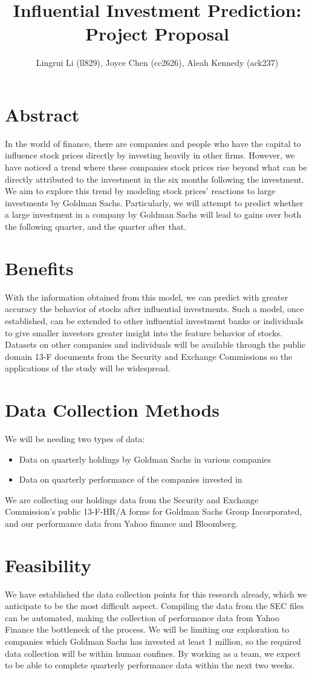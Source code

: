 \documentclass{article}
\title{Influential Investment Prediction: Project Proposal}
\author{Lingrui Li (ll829), Joyce Chen (cc2626), Aleah Kennedy (ack237)}
\begin{document}
\maketitle
\section*{Abstract}
In the world of finance, there are companies and people who have the capital to influence stock prices directly by investing heavily in other firms. However, we have noticed a trend where these companies stock prices rise beyond what can be directly attributed to the investment in the six months following the investment. We aim to explore this trend by modeling stock prices' reactions to large investments by Goldman Sachs. Particularly, we will attempt to predict whether a large investment in a company by Goldman Sachs will lead to gains over both the following quarter, and the quarter after that.

\section*{Benefits}
With the information obtained from this model, we can predict with greater accuracy the behavior of stocks after influential investments. Such a model, once established, can be extended to other influential investment banks or individuals to give smaller investors greater insight into the feature behavior of stocks. Datasets on other companies and individuals will be available through the public domain 13-F documents from the Security and Exchange Commissions so the applications of the study will be widespread.

\section*{Data Collection Methods} 
We will be needing two types of data: 
\begin{itemize}
\item Data on quarterly holdings by Goldman Sachs in various companies
\item Data on quarterly performance of the companies invested in
\end{itemize}

We are collecting our holdings data from the Security and Exchange Commission's public 13-F-HR/A forms for Goldman Sachs Group Incorporated, and our performance data from Yahoo finance and Bloomberg. 
\section*{Feasibility}
We have established the data collection points for this research already, which we anticipate to be the most difficult aspect. Compiling the data from the SEC files can be automated, making the collection of performance data from Yahoo Finance the bottleneck of the process. We will be limiting our exploration to companies which Goldman Sachs has invested at least 1 million, so the required data collection will be within human confines. By working as a team, we expect to be able to complete quarterly performance data within the next two weeks.
\end{document}
